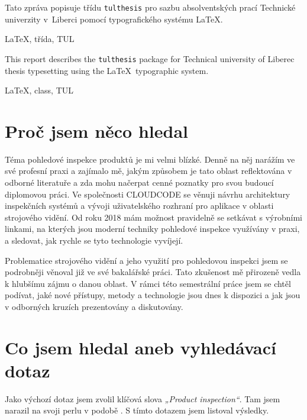 \documentclass[FM,SP,localfonts]{tulthesis}
\begin{document}

\begin{abstractCZ}
Tato zpráva popisuje třídu \texttt{tulthesis} pro sazbu absolventských prací
Technické univerzity v~Liberci pomocí typografického systému \LaTeX.
\end{abstractCZ}

\begin{keywordsCZ}
\LaTeX, třída, TUL
\end{keywordsCZ}

\vspace{2cm}

\begin{abstractEN}
This report describes the \texttt{tulthesis} package for Technical university of
Liberec thesis typesetting using the \LaTeX\ typographic system.
\end{abstractEN}

\begin{keywordsEN}
\LaTeX, class, TUL
\end{keywordsEN}

\clearpage

\tableofcontents

\clearpage

\chapter{Proč jsem něco hledal}
Téma pohledové inspekce produktů je mi velmi blízké. Denně na něj narážím ve své profesní praxi a zajímalo mě, jakým způsobem je tato oblast reflektována v odborné literatuře a zda mohu načerpat cenné poznatky pro svou budoucí diplomovou práci. Ve společnosti CLOUDCODE se věnuji návrhu architektury inspekčních systémů a vývoji uživatelského rozhraní pro aplikace v oblasti strojového vidění. Od roku 2018 mám možnost pravidelně se setkávat s výrobními linkami, na kterých jsou moderní techniky pohledové inspekce využívány v praxi, a sledovat, jak rychle se tyto technologie vyvíjejí.

Problematice strojového vidění a jeho využití pro pohledovou inspekci jsem se podrobněji věnoval již ve své bakalářské práci. Tato zkušenost mě přirozeně vedla k hlubšímu zájmu o danou oblast. V rámci této semestrální práce jsem se chtěl podívat, jaké nové přístupy, metody a technologie jsou dnes k dispozici a jak jsou v odborných kruzích prezentovány a diskutovány.

\chapter{Co jsem hledal aneb vyhledávací dotaz}
Jako výchozí dotaz jsem zvolil klíčová slova \textit{„Product inspection“}. Tam jsem narazil na svoji perlu v podobě \parencite{Kim2021}. S tímto dotazem jsem listoval výsledky.
\end{document}

